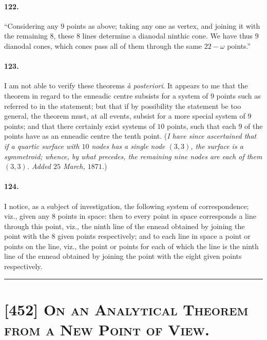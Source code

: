 \documentclass[11pt,a4paper]{article}
\begin{document}
\paragraph{122.}
``Considering any $9$ points as above; taking any one as vertex, and
joining it with the remaining $8$, these $8$ lines determine a dianodal
ninthic cone. We have thus $9$ dianodal cones, which cones pass all of
them through the same $22 - \omega$ points.''

\paragraph{123.}
I am not able to verify these theorems \textit{\`a posteriori}. It appears
to me that the theorem in regard to the enneadic centre subsists for a
system of $9$ points such as referred to in the statement; but that if by
possibility the statement be too general, the theorem must, at all events,
subsist for a more special system of $9$ points; and that there certainly
exist systems of $10$ points, such that each $9$ of the points have as an
enneadic centre the tenth point. (\textit{I have since ascertained that
if a quartic surface with $10$ nodes has a single node $(3, 3)$, the
surface is a symmetroid; whence, by what precedes, the remaining nine
nodes are each of them $(3, 3)$. Added $25$ March, $1871$.})

\paragraph{124.}
I notice, as a subject of investigation, the following system of
correspondence; viz., given any $8$ points in space: then to every point
in space corresponds a line through this point, viz., the ninth line of
the ennead obtained by joining the point with the $8$ given points
respectively; and to each line in space a point or points on the line,
viz., the point or points for each of which the line is the ninth line of
the ennead obtained by joining the point with the eight given points
respectively.

\bigskip
\hrule
\bigskip

\section*{[452] \textsc{On an Analytical Theorem from a New Point of View.}}
\end{document}

